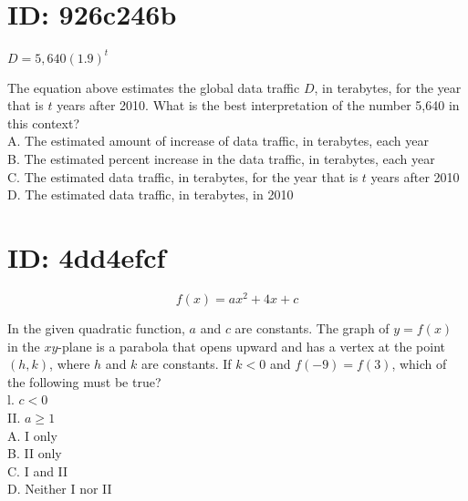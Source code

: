\section*{ID: 926c246b}
$D=5,640(1.9)^{t}$

The equation above estimates the global data traffic $D$, in terabytes, for the year that is $t$ years after 2010. What is the best interpretation of the number 5,640 in this context?\\
A. The estimated amount of increase of data traffic, in terabytes, each year\\
B. The estimated percent increase in the data traffic, in terabytes, each year\\
C. The estimated data traffic, in terabytes, for the year that is $t$ years after 2010\\
D. The estimated data traffic, in terabytes, in 2010

\section*{ID: 4dd4efcf}
$$
f(x)=a x^{2}+4 x+c
$$

In the given quadratic function, $a$ and $c$ are constants. The graph of $y=f(x)$ in the $x y$-plane is a parabola that opens upward and has a vertex at the point $(h, k)$, where $h$ and $k$ are constants. If $k<0$ and $f(-9)=f(3)$, which of the following must be true?\\
l. $c<0$\\
II. $a \geq 1$\\
A. I only\\
B. II only\\
C. I and II\\
D. Neither I nor II\\




















































